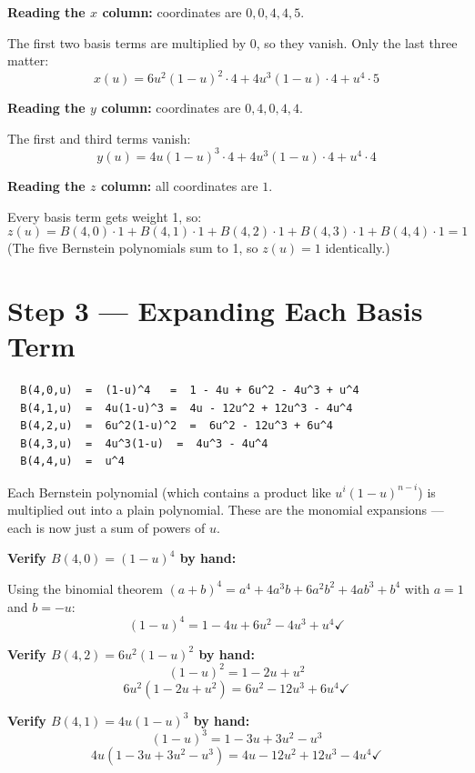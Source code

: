 \documentclass[12pt, a4paper]{article}
\begin{document}
\begin{examplebox}
\textbf{Reading the $x$ column:} coordinates are $0, 0, 4, 4, 5$.

The first two basis terms are multiplied by 0, so they vanish.
Only the last three matter:
\[
  x(u) = 6u^2(1-u)^2 \cdot 4
        + 4u^3(1-u) \cdot 4
        + u^4 \cdot 5
\]

\textbf{Reading the $y$ column:} coordinates are $0, 4, 0, 4, 4$.

The first and third terms vanish:
\[
  y(u) = 4u(1-u)^3 \cdot 4
        + 4u^3(1-u) \cdot 4
        + u^4 \cdot 4
\]

\textbf{Reading the $z$ column:} all coordinates are $1$.

Every basis term gets weight 1, so:
\[
  z(u) = B(4,0) \cdot 1 + B(4,1) \cdot 1 + B(4,2) \cdot 1
        + B(4,3) \cdot 1 + B(4,4) \cdot 1
       = 1
\]
(The five Bernstein polynomials sum to 1, so $z(u) = 1$ identically.)
\end{examplebox}


\section{Step 3 --- Expanding Each Basis Term}

\begin{verbatim}
  B(4,0,u)  =  (1-u)^4   =  1 - 4u + 6u^2 - 4u^3 + u^4
  B(4,1,u)  =  4u(1-u)^3 =  4u - 12u^2 + 12u^3 - 4u^4
  B(4,2,u)  =  6u^2(1-u)^2  =  6u^2 - 12u^3 + 6u^4
  B(4,3,u)  =  4u^3(1-u)  =  4u^3 - 4u^4
  B(4,4,u)  =  u^4
\end{verbatim}

Each Bernstein polynomial (which contains a product like $u^i(1-u)^{n-i}$)
is multiplied out into a plain polynomial.
These are the monomial expansions --- each is now just a sum of powers of $u$.

\begin{examplebox}
\textbf{Verify $B(4,0) = (1-u)^4$ by hand:}

Using the binomial theorem $(a+b)^4 = a^4 + 4a^3b + 6a^2b^2 + 4ab^3 + b^4$
with $a=1$ and $b=-u$:
\[
  (1-u)^4 = 1 - 4u + 6u^2 - 4u^3 + u^4 \checkmark
\]

\textbf{Verify $B(4,2) = 6u^2(1-u)^2$ by hand:}
\[
  (1-u)^2 = 1 - 2u + u^2
\]
\[
  6u^2(1 - 2u + u^2) = 6u^2 - 12u^3 + 6u^4 \checkmark
\]

\textbf{Verify $B(4,1) = 4u(1-u)^3$ by hand:}
\[
  (1-u)^3 = 1 - 3u + 3u^2 - u^3
\]
\[
  4u(1 - 3u + 3u^2 - u^3) = 4u - 12u^2 + 12u^3 - 4u^4 \checkmark
\]
\end{examplebox}
\end{document}
